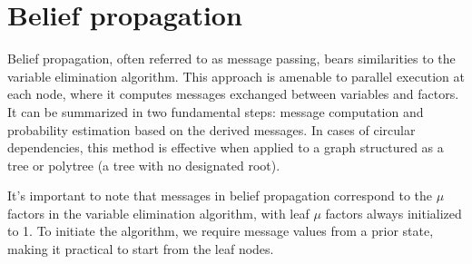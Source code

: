\section{Belief propagation}

Belief propagation, often referred to as message passing, bears similarities to the variable elimination algorithm.
This approach is amenable to parallel execution at each node, where it computes messages exchanged between variables and factors.
It can be summarized in two fundamental steps: message computation and probability estimation based on the derived messages.
In cases of circular dependencies, this method is effective when applied to a graph structured as a tree or polytree (a tree with no designated root).

It's important to note that messages in belief propagation correspond to the $\mu$ factors in the variable elimination algorithm, with leaf $\mu$ factors always initialized to 1.
To initiate the algorithm, we require message values from a prior state, making it practical to start from the leaf nodes.

